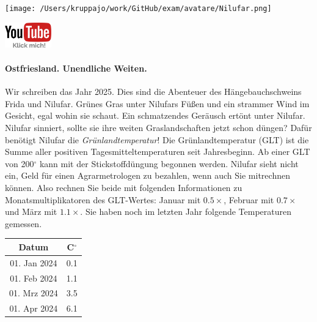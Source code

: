 \documentclass[a4paper, 9pt]{scrartcl}\usepackage[]{graphicx}\usepackage[]{xcolor}
\begin{document}
 
\ifcollection
\begin{flushright}
\tiny\vspace{-3Ex}
\textbf{\examinhaltstart}
\exammodulemathstat
\vspace{-4Ex}
\end{flushright}
\begin{minipage}[t]{0.5\textwidth}
\texttt{[image: /Users/kruppajo/work/GitHub/exam/avatare/Nilufar.png]}
\end{minipage}
\begin{minipage}[t]{0.5\textwidth}
\hfill
\href{https://youtu.be/fiWGgCX-cE4}{\includegraphics[width = 2cm]{img/youtube}}
\end{minipage}
\fi






\ifcollection
\paragraph{Ostfriesland. Unendliche Weiten.}
\fi



Wir schreiben das Jahr 2025. Dies sind die Abenteuer des Hängebauchschweins Frida und Nilufar. Grünes Gras unter Nilufars Füßen und ein strammer Wind im Gesicht, egal wohin sie schaut. Ein schmatzendes Geräusch ertönt unter Nilufar. Nilufar sinniert, sollte sie ihre weiten Graslandschaften jetzt schon düngen? Dafür benötigt Nilufar die \textit{Grünlandtemperatur}! Die Grünlandtemperatur (GLT) ist die Summe aller positiven Tagesmitteltemperaturen seit Jahresbeginn. Ab einer GLT von 200$^\circ$ kann mit der Stickstoffdüngung begonnen werden. Nilufar sieht nicht ein, Geld für einen Agrarmetrologen zu bezahlen, wenn auch Sie mitrechnen können. Also rechnen Sie beide mit folgenden Informationen zu Monatsmultiplikatoren des GLT-Wertes: Januar mit $0.5\times$, Februar mit $0.7\times$ und März mit
$1.1\times$. Sie haben noch im letzten Jahr folgende Temperaturen gemessen.

\begin{center}
\begin{tabular}{cc}
  \toprule
  Datum & C$^\circ$ \\
  \midrule
  01. Jan 2024 & 0.1\\
  01. Feb 2024 & 1.1\\
  01. Mrz 2024 & 3.5\\
  01. Apr 2024 & 6.1\\
  \bottomrule
\end{tabular}
\end{center}
\end{document}
